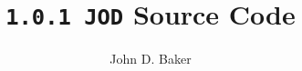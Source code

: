 %
%
%
%



\author{John D. Baker}
\title{\texttt{1.0.1 JOD} Source Code}

\setlength{\columnsep}{3em}
\setlength{\columnseprule}{0.5pt}
\twocolumn

\maketitle
\tableofcontents
\onecolumn

\newpage


\newpage


\newpage


\newpage


\newpage


\newpage


%

\newpage
{}
{}
\printindex


